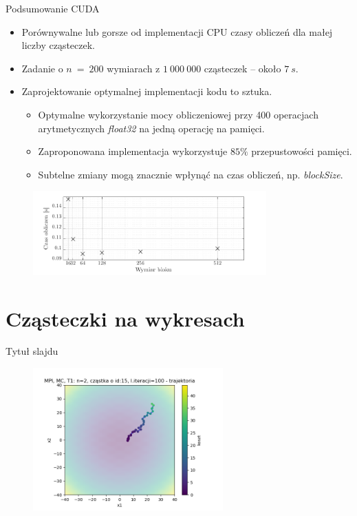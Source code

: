 \documentclass[handout]{beamer}
\begin{document}
\begin{frame}{Podsumowanie CUDA}
\begin{itemize}
\item Porównywalne lub gorsze od implementacji CPU czasy obliczeń dla małej liczby cząsteczek.
\item Zadanie o $n \ = \ 200$ wymiarach z $1 \ 000 \ 000$ cząsteczek -- około $7 \ s$.
\item Zaprojektowanie optymalnej implementacji kodu to sztuka.
\begin{itemize}
\item Optymalne wykorzystanie mocy obliczeniowej przy 400 operacjach arytmetycznych \textit{float32} na jedną operację na pamięci.
\item Zaproponowana implementacja wykorzystuje $85\% $ przepustowości pamięci.
\item Subtelne zmiany mogą znacznie wpłynąć na czas obliczeń, np. \textit{blockSize}.
\end{itemize}
\end{itemize}
\begin{figure}[t]
\includegraphics[width=0.8\textwidth]{grafiki/blocksizeplot.pdf}
\end{figure}
\end{frame}



\section{Cząsteczki na wykresach}
\begin{frame}{Tytuł slajdu}
\begin{figure}[t]
\includegraphics[width=0.65\textwidth]{grafiki/MPI_ MC_T1_trajectory_id15.png}
\end{figure}
\end{frame}
\end{document}
